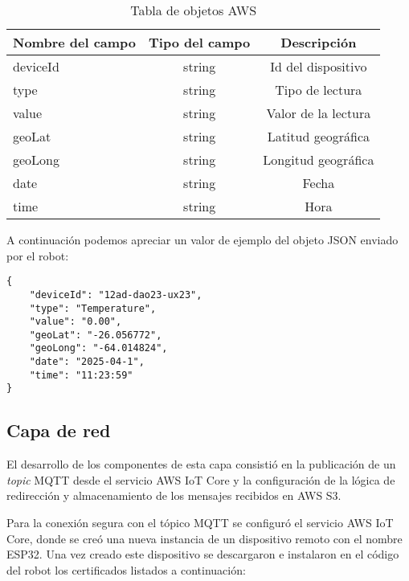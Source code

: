 \begin{table}[h]
	\centering
	\caption[caption corto]{Tabla de objetos AWS}
	\begin{tabular}{l c c}    
		\toprule
		\textbf{Nombre del campo} & \textbf{Tipo del campo} & \textbf{Descripción}  \\
		\midrule
		deviceId & string & Id del dispositivo \\		
		type & string & Tipo de lectura \\		
		value & string & Valor de la lectura \\		
		geoLat & string & Latitud geográfica \\		
		geoLong & string & Longitud geográfica\\		
		date & string & Fecha \\		
		time & string & Hora \\		
		
		\bottomrule
		\hline
	\end{tabular}
	\label{tab:json_fields}
\end{table}


A continuación podemos apreciar un valor de ejemplo del objeto JSON enviado por el robot:

\begin{lstlisting}
{   	
	"deviceId": "12ad-dao23-ux23",
	"type": "Temperature",
	"value": "0.00",
	"geoLat": "-26.056772",
	"geoLong": "-64.014824",
	"date": "2025-04-1",
	"time": "11:23:59"
}
\end{lstlisting}

\subsection{Capa de red}

El desarrollo de los componentes de esta capa consistió en la publicación de un \textit{topic} MQTT desde el servicio AWS IoT Core y la configuración de la lógica de redirección y almacenamiento de los mensajes recibidos en AWS S3.


Para la conexión segura con el tópico MQTT se configuró el servicio AWS IoT Core, donde se creó una nueva instancia de un dispositivo remoto con el nombre ESP32. Una vez creado este dispositivo se descargaron e instalaron en el código del robot los certificados listados a continuación:


